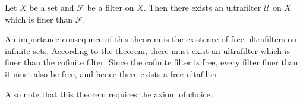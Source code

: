 \documentclass[12pt]{article}
\begin{document}
Let $X$ be a set and $\mathcal{F}$ be a filter on $X$.  Then there exists an ultrafilter $\mathcal{U}$ on $X$ which is finer than $\mathcal{F}$.

An importance consequnce of this theorem is the existence of free ultrafilters on infinite sets.  According to the theorem, there must exist an ultrafilter which is finer than the cofinite filter.  Since the cofinite filter is free, every filter finer than it must also be free, and hence there exists a free ultafilter.

Also note that this theorem requires the axiom of choice.
\end{document}
